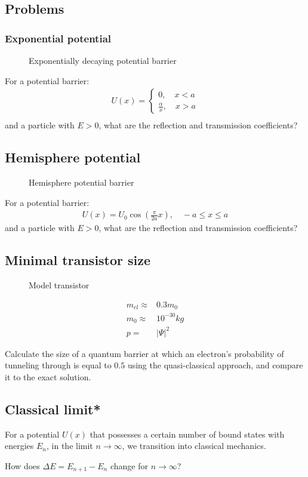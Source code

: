 	\subsection{Problems}
		\subsubsection{Exponential potential}
			\begin{figure}[!h]
				\centering
				
				\caption{Exponentially decaying potential barrier}
			\end{figure}
			For a potential barrier:
			\begin{align}
				U(x) = \left\{ \begin{aligned}
					0,\quad x < a \\
					\frac{\alpha}{x},\quad x > a
				\end{aligned}
				\right. \\
			\end{align}
			and a particle with $E > 0$, what are the reflection and transmission coefficients?
			
		\subsection{Hemisphere potential}
			\begin{figure}[!h]
				\centering
				
				\caption{Hemisphere potential barrier}
			\end{figure}
			For a potential barrier:
			\begin{align}
				U(x) = U_0 \cos(\frac{\pi}{2a}x), \quad -a \leq x \leq a
			\end{align}
			and a particle with $E > 0$, what are the reflection and transmission coefficients?
		\subsection{Minimal transistor size}
			\begin{figure}[!h]
				\centering
				
				\caption{Model transistor}
			\end{figure}
			
			\begin{align}
				m_{el} \approx& 0.3 m_0 \\
				m_0 \approx& 10^{-30}\si{kg} \\
				p =& |\Psi|^2
			\end{align}			
			
			Calculate the size of a quantum barrier at which an electron's probability of tunneling through is equal to $0.5$ using the quasi-classical approach, and compare it to the exact solution.
		
		\subsection{Classical limit*}	
			For a potential $U(x)$ that possesses a certain number of bound states with energies $E_n$, in the limit $n\rightarrow\infty$, we transition into classical mechanics. 
			
			How does $\Delta E = E_{n+1}-E_n$ change for $n\rightarrow\infty$?
